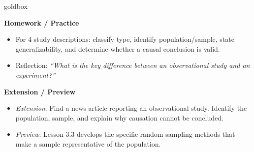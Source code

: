 \documentclass[10pt]{article}
\begin{document}
\begin{skillbox}{goldbox}
\begin{minipage}[t]{0.48\linewidth}
    \textbf{Homework / Practice}
    \begin{itemize}
        \item For 4 study descriptions: classify type, identify population/sample,
              state generalizability, and determine whether a causal conclusion is valid.
        \item Reflection: \textit{``What is the key difference between an observational
              study and an experiment?''}
    \end{itemize}
\end{minipage}
\hfill
\begin{minipage}[t]{0.48\linewidth}
    \textbf{Extension / Preview}
    \begin{itemize}
        \item \textit{Extension}: Find a news article reporting an observational study.
              Identify the population, sample, and explain why causation cannot be
              concluded.
        \item \textit{Preview}: Lesson 3.3 develops the specific random sampling
              methods that make a sample representative of the population.
    \end{itemize}
\end{minipage}
\end{skillbox}
\end{document}
